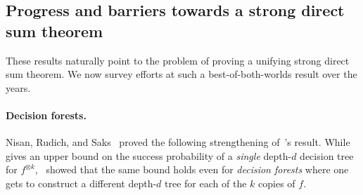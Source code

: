 \documentclass[11pt]{article}
\begin{document}





  


\subsection{Progress and barriers towards a strong direct sum theorem}


These results naturally point to the problem of proving a unifying strong direct sum theorem. We now survey efforts at such a best-of-both-worlds result over the years. 

\paragraph{Decision forests.} Nisan, Rudich, and Saks~\cite{NRS94} proved the following strengthening of~\cite{IRW94}’s result. While~\cite{IRW94} gives an upper bound on the success probability of a {\sl single} depth-$d$ decision tree for $f^{\otimes k}$,~\cite{NRS94} showed that the same bound holds even for {\sl decision forests} where one gets to construct a different depth-$d$ tree for each of the $k$ copies of $f$.     
\end{document}
